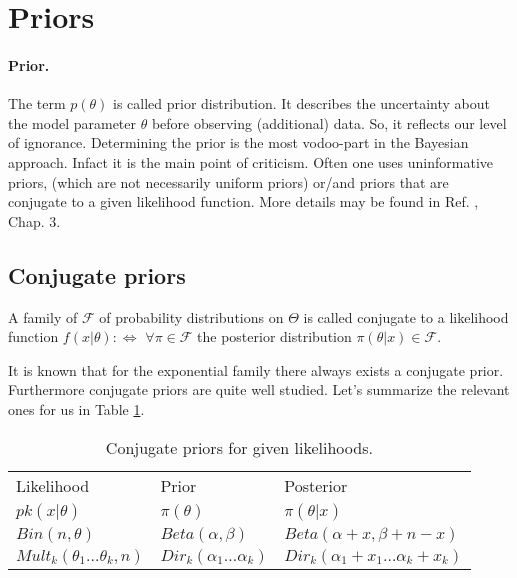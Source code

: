 \section{Priors}
\paragraph*{Prior.} The term $p(\theta)$ is called prior distribution. It describes the uncertainty about the model parameter $\theta$ before observing (additional) data. So, it reflects our level of ignorance. Determining the prior is the most vodoo-part in the Bayesian approach. Infact it is the main point of criticism. Often one uses uninformative priors, (which are not necessarily uniform priors) or/and priors that are conjugate to a given likelihood function.
More details may be found in Ref. \cite{robert}, Chap. 3.
\subsection{Conjugate priors}
\begin{definition} A family of $\mathcal F$ of probability distributions on $\Theta$ is called conjugate to a likelihood function $f(x|\theta) :\Leftrightarrow$  $\forall \pi \in \mathcal F$ the posterior distribution $\pi(\theta|x) \in \mathcal F$.  
\end{definition}
It is known that for the exponential family there always exists a conjugate prior. Furthermore conjugate priors are quite well studied.
Let's summarize the relevant ones for us in Table \ref{tab:conjugate_priors}.
\begin{table}
\begin{tabular}{lll}
\hline \hline
Likelihood & Prior &Posterior \\
$pk(x|\theta)$ & $\pi(\theta)$ & $\pi(\theta|x)$ \\
\hline
$ Bin (n, \theta)$ &  $Beta (\alpha, \beta)$ &  $Beta (\alpha +x, \beta + n -x)$  \\
$Mult_k(\theta_1 \dots \theta_k, n)$ 
& $Dir_k(\alpha_1 \dots \alpha_k)$   
& $Dir_k(\alpha_1 + x_1 \dots \alpha_k + x_k)$  \\
\hline\hline
\end{tabular}
\caption{\label{tab:conjugate_priors}Conjugate priors for given likelihoods.}
\end{table}
